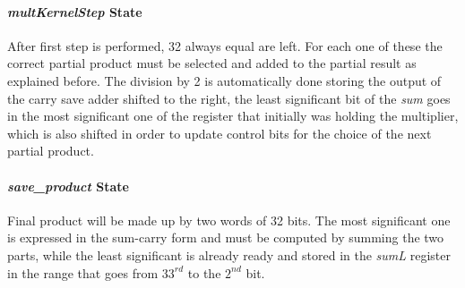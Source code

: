 \paragraph{\textit{multKernelStep} State}
After first step is performed, 32 always equal are left. For each one of these the correct partial product must be selected and added to the partial result as explained before. The division by 2 is automatically done storing the output of the carry save adder shifted to the right, the least significant bit of the \textit{sum} goes in the most significant one of the register that initially was holding the multiplier, which is also shifted in order to update control bits for the choice of the next partial product.
\paragraph{\textit{save\_product} State}
Final product will be made up by two words of 32 bits. The most significant one is expressed in the sum-carry form and must be computed by summing the two parts, while the least significant is already ready and stored in the \textit{sumL} register in the range that goes from $33^{rd}$ to the $2^{nd}$ bit.
